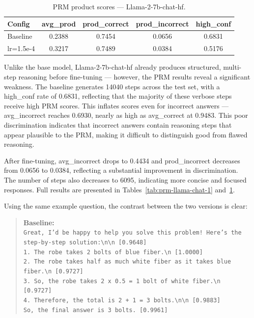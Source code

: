   \begin{table}[ht]
  \caption{PRM product scores --- Llama-2-7b-chat-hf.}
  \centering
  \footnotesize
  \begin{tabular}{lcccc}
  \toprule
  \textbf{Config} & \textbf{avg\_prod} & \textbf{prod\_correct} & \textbf{prod\_incorrect} & \textbf{high\_conf} \\
  \midrule
  Baseline        & 0.2388 & 0.7454 & 0.0656 & 0.6831 \\
  lr=1.5e-4 & 0.3217 & 0.7489 & 0.0384 & 0.5176 \\
  \bottomrule
  \end{tabular}

  \label{tab:prm-llama-chat-2}
  \end{table}
  Unlike the base model, Llama-2-7b-chat-hf already
  produces structured, multi-step reasoning before
  fine-tuning --- however, the PRM results reveal a
  significant weakness. The baseline generates 14040 steps across the
  test set, with a high\_conf rate of 0.6831,
  reflecting that the majority of these verbose
  steps receive high PRM scores. This inflates
  scores even for incorrect answers --- avg\_incorrect
  reaches 0.6930, nearly as high as avg\_correct
  at 0.9483. This poor discrimination indicates
  that incorrect answers contain reasoning steps
  that appear plausible to the PRM, making it
  difficult to distinguish good from flawed
  reasoning.

  After fine-tuning, avg\_incorrect drops to 0.4434
  and prod\_incorrect decreases from 0.0656 to
  0.0384, reflecting a substantial improvement in
  discrimination. The number of steps also decreases
  to 6095, indicating more concise and focused
  responses. Full
  results are presented in
  Tables~\ref{tab:prm-llama-chat-1}
  and~\ref{tab:prm-llama-chat-2}.

Using the same example question, the contrast
  between the two versions is clear:
\begin{quote}
  \textbf{Baseline:}\\
  \texttt{Great, I'd be happy to help you solve
  this problem! Here's the \\step-by-step solution:\textbackslash n\textbackslash n
  [0.9648]\\
  1. The robe takes 2 bolts of blue fiber.\textbackslash n [1.0000]\\
  2. The robe takes half as much white fiber as
  it takes blue \\fiber.\textbackslash n [0.9727]\\
  3. So, the robe takes 2 x 0.5 = 1 bolt of white
  fiber.\textbackslash n [0.9727]\\
  4. Therefore, the total is 2 + 1 = 3 bolts.\textbackslash n\textbackslash n [0.9883]\\
  So, the final answer is 3 bolts. [0.9961]}
  \end{quote}

